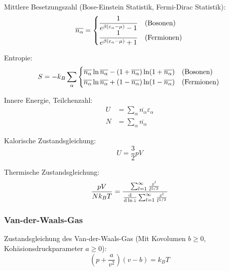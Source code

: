 \documentclass[11pt]{article}
\numberwithin{equation}{section}
\begin{document}
				\noindent
				Mittlere Besetzungszahl (Bose-Einstein Statistik, Fermi-Dirac Statistik):
				\begin{equation}
					\overline{n_\alpha} =
						\begin{cases}
							\dfrac{1}{e^{\beta(\varepsilon_\alpha-\mu)} - 1} & \text{(Bosonen)} \\
							\dfrac{1}{e^{\beta(\varepsilon_\alpha-\mu)} + 1} & \text{(Fermionen)}
						\end{cases} \\
				\end{equation}

				\noindent
				Entropie:
				\begin{equation}
					S= -k_B\sum_\alpha
						\begin{cases}
							\overline{n_\alpha} \ln \overline{n_\alpha} - (1+\overline{n_\alpha}) \ln (1+\overline{n_\alpha}) & \text{(Bosonen)} \\
							\overline{n_\alpha} \ln \overline{n_\alpha} + (1-\overline{n_\alpha}) \ln (1-\overline{n_\alpha}) & \text{(Fermionen)}
						\end{cases} \\
				\end{equation}

				\noindent
				Innere Energie, Teilchenzahl:
				\begin{equation}
					\begin{aligned}
						U &= \sum_\alpha \overline{n_\alpha} \varepsilon_\alpha \\
						N &= \sum_\alpha \overline{n_\alpha}
					\end{aligned}
				\end{equation}

				\noindent
				Kalorische Zustandsgleichung:
				\begin{equation}
					U=\frac{3}{2}pV
				\end{equation}

				\noindent
				Thermische Zustandsgleichung:
				\begin{equation}
					\frac{pV}{N k_B T} = \frac{\sum_{l=1}^{\infty}\frac{z^l}{l^{5/2}}}{\frac{\mathrm{d} }{\mathrm{d} \ln z}\sum_{l=1}^{\infty}\frac{z^l}{l^{5/2}}}
				\end{equation}

			\subsubsection{Van-der-Waals-Gas}
				\noindent
				Zustandsgleichung des Van-der-Waals-Gas (Mit Kovolumen $b \ge 0$, Kohäsionsdruckparameter $a \ge 0$):
				\begin{equation}
					\left( p+\frac{a}{v^2} \right) \left( v-b \right) = k_B T
				\end{equation}
\end{document}
